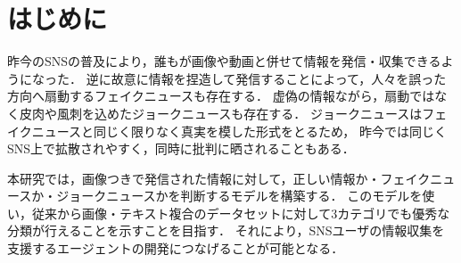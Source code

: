 \section{はじめに}\label{ch:introduction}
%
昨今のSNSの普及により，誰もが画像や動画と併せて情報を発信・収集できるようになった．
逆に故意に情報を捏造して発信することによって，人々を誤った方向へ扇動するフェイクニュースも存在する．
虚偽の情報ながら，扇動ではなく皮肉や風刺を込めたジョークニュースも存在する．
ジョークニュースはフェイクニュースと同じく限りなく真実を模した形式をとるため，
昨今では同じくSNS上で拡散されやすく，同時に批判に晒されることもある．

本研究では，画像つきで発信された情報に対して，正しい情報か・フェイクニュースか・ジョークニュースかを判断するモデルを構築する．
このモデルを使い，従来から画像・テキスト複合のデータセットに対して3カテゴリでも優秀な分類が行えることを示すことを目指す．
それにより，SNSユーザの情報収集を支援するエージェントの開発につなげることが可能となる．

